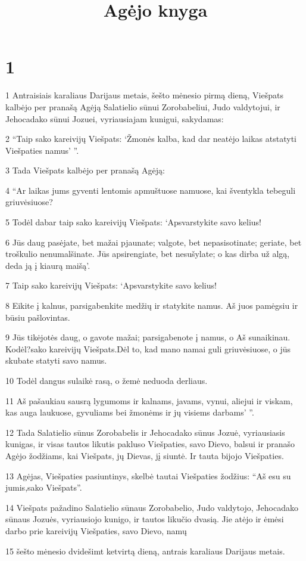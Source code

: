 

\title{Agėjo knyga}

\chapter{1}


\par 1 Antraisiais karaliaus Darijaus metais, šešto mėnesio pirmą dieną, Viešpats kalbėjo per pranašą Agėją Salatielio sūnui Zorobabeliui, Judo valdytojui, ir Jehocadako sūnui Jozuei, vyriausiajam kunigui, sakydamas: 
\par 2 “Taip sako kareivijų Viešpats: ‘Žmonės kalba, kad dar neatėjo laikas atstatyti Viešpaties namus’ ”. 
\par 3 Tada Viešpats kalbėjo per pranašą Agėją: 
\par 4 “Ar laikas jums gyventi lentomis apmuštuose namuose, kai šventykla tebeguli griuvėsiuose? 
\par 5 Todėl dabar taip sako kareivijų Viešpats: ‘Apsvarstykite savo kelius! 
\par 6 Jūs daug pasėjate, bet mažai pjaunate; valgote, bet nepasisotinate; geriate, bet troškulio nenumalšinate. Jūs apsirengiate, bet nesušylate; o kas dirba už algą, deda ją į kiaurą maišą’. 
\par 7 Taip sako kareivijų Viešpats: ‘Apsvarstykite savo kelius! 
\par 8 Eikite į kalnus, parsigabenkite medžių ir statykite namus. Aš juos pamėgsiu ir būsiu pašlovintas. 
\par 9 Jūs tikėjotės daug, o gavote mažai; parsigabenote į namus, o Aš sunaikinau. Kodėl?­sako kareivijų Viešpats.­Dėl to, kad mano namai guli griuvėsiuose, o jūs skubate statyti savo namus. 
\par 10 Todėl dangus sulaikė rasą, o žemė neduoda derliaus. 
\par 11 Aš pašaukiau sausrą lygumoms ir kalnams, javams, vynui, aliejui ir viskam, kas auga laukuose, gyvuliams bei žmonėms ir jų visiems darbams’ ”. 
\par 12 Tada Salatielio sūnus Zorobabelis ir Jehocadako sūnus Jozuė, vyriausiasis kunigas, ir visas tautos likutis pakluso Viešpaties, savo Dievo, balsui ir pranašo Agėjo žodžiams, kai Viešpats, jų Dievas, jį siuntė. Ir tauta bijojo Viešpaties. 
\par 13 Agėjas, Viešpaties pasiuntinys, skelbė tautai Viešpaties žodžius: “Aš esu su jumis,­sako Viešpats”. 
\par 14 Viešpats pažadino Salatielio sūnaus Zorobabelio, Judo valdytojo, Jehocadako sūnaus Jozuės, vyriausiojo kunigo, ir tautos likučio dvasią. Jie atėjo ir ėmėsi darbo prie kareivijų Viešpaties, savo Dievo, namų 
\par 15 šešto mėnesio dvidešimt ketvirtą dieną, antrais karaliaus Darijaus metais.


